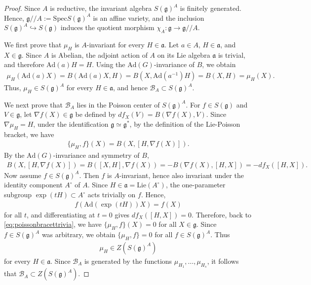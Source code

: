 \documentclass[11pt,reqno]{amsart}
\newtheorem*{theorem A}{Main Theorem A}
\newtheorem*{theorem B}{Main Theorem B}
\newtheorem*{theorem C}{Main Theorem C}
\newtheorem*{theorem D}{Main Theorem D}
\theoremstyle{definition}
\theoremstyle{plain}
\theoremstyle{conclusion}
\begin{document}
\begin{proof}
Since $A$ is reductive, the invariant algebra $S(\mathfrak{g})^A$ is finitely generated. Hence, $\mathfrak{g}//A:=\mathrm{Spec}S(\mathfrak{g})^A$ is an affine variety, and the inclusion $S(\mathfrak{g})^A\hookrightarrow S(\mathfrak{g})$ induces the quotient morphism $\chi_A:\mathfrak{g}\longrightarrow \mathfrak{g}//A$. 

We first prove that $\mu_H$ is $A$-invariant for every $H\in\mathfrak{a}$. Let $a \in A$, $H\in\mathfrak{a}$, and $X \in\mathfrak{g}$. Since $A$ is Abelian, the adjoint action of $A$ on its Lie algebra $\mathfrak{a}$ is trivial, and therefore $\mathrm{Ad}(a) H= H$. Using the $\mathrm{Ad}(G)$-invariance of $B$, we obtain \begin{align*}
\mu_H(\mathrm{Ad}(a)X) = B(\mathrm{Ad}(a)X,H) = B(X,\mathrm{Ad}(a^{-1})H) = B(X,H) = \mu_H(X).
\end{align*} Thus, $\mu_H \in S(\mathfrak{g})^A$ for every $H\in\mathfrak{a}$, and hence $\mathcal{B}_A\subset S(\mathfrak{g})^A$. 

We next prove that $\mathcal{B}_A$ lies in the Poisson center of $S(\mathfrak{g})^A$. For $f\in S(\mathfrak{g})$ and $V \in \mathfrak{g}$, let $\nabla f(X)\in\mathfrak{g}$ be defined by  $df_X(V)=B(\nabla f(X),V)$. Since $\nabla\mu_H=H $, under the identification $\mathfrak{g}\simeq\mathfrak{g}^*$, by the definition of the Lie-Poisson bracket, we have \begin{align}
\{\mu_H,f\}(X) = B \left(X,[H,\nabla f(X)]\right). \label{eq:poissonbracettrivia}
\end{align} By the $\mathrm{Ad}(G)$-invariance and symmetry of $B$, \begin{align*}
B \left(X,[H,\nabla f(X)]\right) = B([X,H],\nabla f(X)) = -B(\nabla f(X),[H,X]) = -df_X([H,X]).
\end{align*}
Now assume $f\in S(\mathfrak{g})^A$. Then $f$ is $A$-invariant, hence also invariant under the identity component $A^\circ$ of $A$. Since $H\in\mathfrak{a}=\mathrm{Lie}(A^\circ)$, the one-parameter subgroup $\exp(tH)\subset A^\circ$ acts trivially on $f$. %
Hence, \begin{align*}
f(\mathrm{Ad}(\exp(tH))X)=f(X)
\end{align*} for all $t$, and differentiating at $t=0$ gives  $df_X([H,X])=0$. Therefore, back to \eqref{eq:poissonbracettrivia}, we have  $\{\mu_H,f\}(X) = 0$  for all $X\in\mathfrak{g}$. Since $f\in S(\mathfrak{g})^A$ was arbitrary, we obtain $\{\mu_H,f\}=0$  for all $f\in S(\mathfrak{g})^A$. Thus \begin{align*}
\mu_H\in Z \left(S(\mathfrak{g})^A\right)
\end{align*} for every $H\in\mathfrak{a}$. Since $\mathcal{B}_A$ is generated by the functions $\mu_{H_1},\dots,\mu_{H_s}$, it follows that $\mathcal{B}_A\subset Z \left(S(\mathfrak{g})^A\right)$. 


\end{proof}
\end{document}
